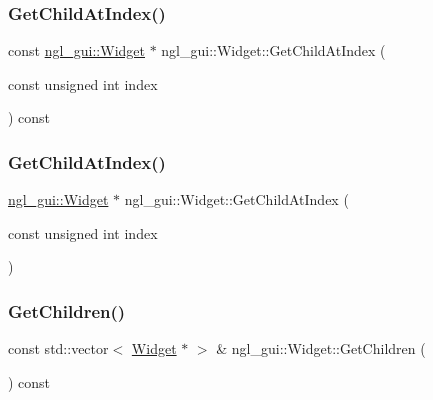 \subsubsection{\texorpdfstring{Get\+Child\+At\+Index()}{GetChildAtIndex()}\hspace{0.1cm}{\footnotesize\ttfamily [1/2]}}
{\footnotesize\ttfamily const \mbox{\hyperlink{classngl__gui_1_1_widget}{ngl\+\_\+gui\+::\+Widget}} $\ast$ ngl\+\_\+gui\+::\+Widget\+::\+Get\+Child\+At\+Index (\begin{DoxyParamCaption}\item[{const unsigned int}]{index }\end{DoxyParamCaption}) const\hspace{0.3cm}{\ttfamily [virtual]}}

\mbox{\label{classngl__gui_1_1_widget_a3817d437db47f680f168652f2dd2815b}} 
\subsubsection{\texorpdfstring{Get\+Child\+At\+Index()}{GetChildAtIndex()}\hspace{0.1cm}{\footnotesize\ttfamily [2/2]}}
{\footnotesize\ttfamily \mbox{\hyperlink{classngl__gui_1_1_widget}{ngl\+\_\+gui\+::\+Widget}} $\ast$ ngl\+\_\+gui\+::\+Widget\+::\+Get\+Child\+At\+Index (\begin{DoxyParamCaption}\item[{const unsigned int}]{index }\end{DoxyParamCaption})\hspace{0.3cm}{\ttfamily [virtual]}}

\mbox{\label{classngl__gui_1_1_widget_a1ab5c80ee91b7d15e1c23197946abf7c}} 
\subsubsection{\texorpdfstring{Get\+Children()}{GetChildren()}}
{\footnotesize\ttfamily const std\+::vector$<$ \mbox{\hyperlink{classngl__gui_1_1_widget}{Widget}} $\ast$ $>$ \& ngl\+\_\+gui\+::\+Widget\+::\+Get\+Children (\begin{DoxyParamCaption}{ }\end{DoxyParamCaption}) const\hspace{0.3cm}{\ttfamily [virtual]}}

